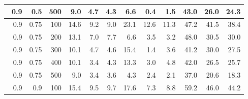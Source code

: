 \begin{longtable}{|r|r|r|r|r|r|r|r|r|r|r|r|}
        \hline \
        0.9                            & 0.5                    & 500                       & 9.0                      & 4.7                       & 4.3                       & 6.6                       & 0.4                       & 1.5                       & 43.0                      & 26.0                      & 24.3                      \\
        \hline \
        0.9                            & 0.75                    & 100                       & 14.6                      & 9.2                       & 9.0                       & 23.1                      & 12.6                       & 11.3                       & 47.2                      & 41.5                      & 38.4                      \\
        \hline \
        0.9                            & 0.75                    & 200                       & 13.1                      & 7.0                       & 7.7                       & 6.6                      & 3.5                       & 3.2                       & 48.0                      & 30.5                      & 30.0                      \\
        \hline \
        0.9                            & 0.75                    & 300                       & 10.1                       & 4.7                       & 4.6                       & 15.4                       & 1.4                       & 3.6                       & 41.2                      & 30.0                      & 27.5                      \\
        \hline \
        0.9                            & 0.75                     & 400                       & 10.1                      & 3.4                       & 4.3                       & 13.3                      & 3.0                       & 4.8                       & 42.0                      & 26.5                      & 25.7                      \\
        \hline \
        0.9                            & 0.75                     & 500                       & 9.0                      & 3.4                       & 3.6                       & 4.3                      & 2.4                       & 2.1                       & 37.0                      & 20.6                      & 18.3                      \\
        \hline \
        0.9                            & 0.9                     & 100                       & 15.4                       & 9.5                       & 9.7                       & 17.6                      & 7.3                       & 8.8                       & 59.2                      & 46.0                      & 44.2                      \\

\end{longtable}
